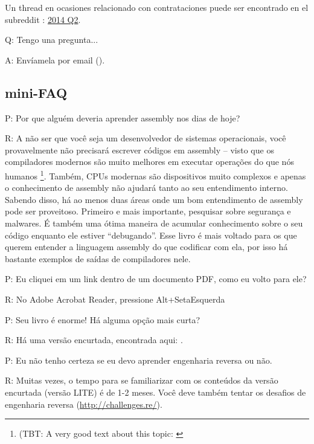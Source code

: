 Un thread en ocasiones relacionado con contrataciones puede ser encontrado en el subreddit :
\href{http://go.yurichev.com/17335}{2014 Q2}.

\par Q: Tengo una pregunta...
\par A: Env\'iamela por email (\EMAIL).

\fi %

\ifdefined\BRAZILIAN
\subsection*{mini-FAQ}

\par P: Por que alguém deveria aprender assembly nos dias de hoje?
\par R: A não ser que você seja um desenvolvedor de sistemas operacionais, você provavelmente não precisará escrever códigos em assembly – visto que os compiladores modernos são muito melhores em executar operações 
do que nós humanos
\footnote{(\ac{TBT}: A very good text about this topic: \cite{AgnerFog}}.
Também, \ac{CPU}s modernas são dispositivos muito complexos e apenas o conhecimento de assembly não ajudará tanto ao seu entendimento interno. Sabendo disso, há ao menos duas áreas onde um bom entendimento de assembly pode ser proveitoso. Primeiro e mais importante, pesquisar sobre segurança e malwares. É também uma ótima maneira de acumular conhecimento sobre o seu código enquanto ele estiver “debugando”. Esse livro é mais voltado para os que querem entender a linguagem assembly do que codificar com ela, por isso há bastante exemplos de saídas de compiladores nele.

\par P: Eu cliquei em um link dentro de um documento PDF, como eu volto para ele?
\par R: No Adobe Acrobat Reader, pressione Alt+SetaEsquerda

\ifx\LITE\undefined
\par P: Seu livro é enorme! Há alguma opção mais curta?
\par R: Há uma versão encurtada, encontrada aqui: \LITEURL{}.
\fi

\par P: Eu não tenho certeza se eu devo aprender engenharia reversa ou não.
\par R: Muitas vezes, o tempo para se familiarizar com os conteúdos da versão encurtada (versão LITE) é de 1-2 meses. Você deve também tentar os desafios de engenharia reversa (\url{http://challenges.re/}).

